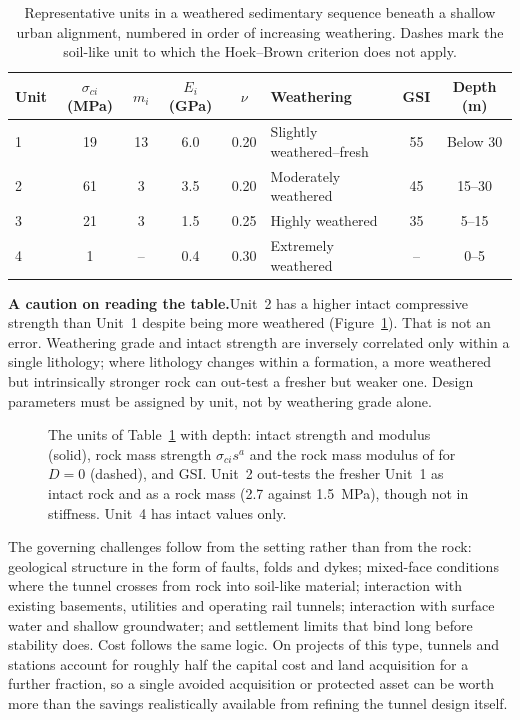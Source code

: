 \begin{table}[htbp]
\caption{Representative units in a weathered sedimentary sequence beneath a
shallow urban alignment, numbered in order of increasing weathering. Dashes
mark the soil-like unit to which the Hoek--Brown criterion does not apply.}
\label{tab:shallow-metro-units}
\centering
\small
\begin{tabularx}{\textwidth}{l c c c c X c c}
\toprule
\textbf{Unit} & $\sigma_{ci}$ \textbf{(MPa)} & $m_i$ & $E_i$ \textbf{(GPa)} & $\nu$ & \textbf{Weathering} & \textbf{GSI} & \textbf{Depth (m)} \\
\midrule
1 & 19 & 13 & 6.0 & 0.20 & Slightly weathered--fresh & 55 & Below 30 \\
2 & 61 & 3 & 3.5 & 0.20 & Moderately weathered & 45 & 15--30 \\
3 & 21 & 3 & 1.5 & 0.25 & Highly weathered & 35 & 5--15 \\
4 & 1 & -- & 0.4 & 0.30 & Extremely weathered & -- & 0--5 \\
\bottomrule
\end{tabularx}
\end{table}

\noindent\textbf{A caution on reading the table.}\enspace Unit~2 has a
higher intact compressive strength than Unit~1 despite being more weathered
(Figure~\ref{fig:chal-metro-units}). That
is not an error. Weathering grade and intact strength are inversely correlated
only within a single lithology; where lithology changes within a formation, a
more weathered but intrinsically stronger rock can out-test a fresher but
weaker one. Design parameters must be assigned by unit, not by weathering
grade alone.

\begin{figure}[htbp]
\centering
{}
\caption{The units of Table~\ref{tab:shallow-metro-units} with depth: intact
strength and modulus (solid), rock mass strength $\sigma_{ci}s^a$ and the rock
mass modulus of \citet{hoekdiederichs2006} for $D = 0$ (dashed), and GSI.
Unit~2 out-tests the fresher Unit~1 as intact rock and as a rock mass
(2.7 against 1.5~MPa), though not in stiffness. Unit~4 has intact values only.}
\label{fig:chal-metro-units}
\end{figure}

The governing challenges follow from the setting rather than from the rock:
geological structure in the form of faults, folds and dykes; mixed-face
conditions where the tunnel crosses from rock into soil-like material;
interaction with existing basements, utilities and operating rail tunnels;
interaction with surface water and shallow groundwater; and settlement limits
that bind long before stability does. Cost follows the same logic. On projects
of this type, tunnels and stations account for roughly half the capital cost
and land acquisition for a further fraction, so a single avoided acquisition
or protected asset can be worth more than the savings realistically available
from refining the tunnel design itself.

